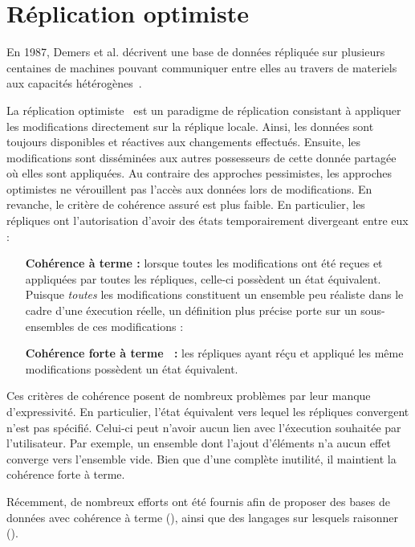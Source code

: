 \section{Réplication optimiste}
\label{repl:sec:optimistic}

En 1987, Demers et al. décrivent une base de données répliquée sur plusieurs
centaines de machines pouvant communiquer entre elles au travers de materiels
aux capacités hétérogènes~\cite{demers1987epidemic}. 

La réplication optimiste~\cite{johnson1975maintenance, saito2005optimistic} est
un paradigme de réplication consistant à appliquer les modifications directement
sur la réplique locale.  Ainsi, les données sont toujours disponibles et
réactives aux changements effectués. Ensuite, les modifications sont disséminées
aux autres possesseurs de cette donnée partagée où elles sont appliquées. Au
contraire des approches pessimistes, les approches optimistes ne vérouillent pas
l'accès aux données lors de modifications. En revanche, le critère de cohérence
assuré est plus faible. En particulier, les répliques ont l'autorisation d'avoir
des états temporairement divergeant entre eux :

\begin{itemize}
\item [\textbf{Cohérence à terme :}] lorsque toutes les modifications ont été
  reçues et appliquées par toutes les répliques, celle-ci possèdent un état
  équivalent. Puisque \emph{toutes} les modifications constituent un ensemble
  peu réaliste dans le cadre d'une éxecution réelle, un définition plus précise
  porte sur un sous-ensembles de ces modifications :
\item [\textbf{Cohérence forte à terme~\cite{shapiro2011conflict} :}] les
  répliques ayant réçu et appliqué les même modifications possèdent un état
  équivalent.
\end{itemize}

Ces critères de cohérence posent de nombreux problèmes par leur manque
d'expressivité. En particulier, l'état équivalent vers lequel les répliques
convergent n'est pas spécifié. Celui-ci peut n'avoir aucun lien avec l'éxecution
souhaitée par l'utilisateur. Par exemple, un ensemble dont l'ajout d'éléments
n'a aucun effet converge vers l'ensemble vide. Bien que d'une complète
inutilité, il maintient la cohérence forte à terme.

Récemment, de nombreux efforts ont été fournis afin de proposer des bases de
données avec cohérence à terme (\REF), ainsi que des langages sur lesquels
raisonner (\REF).

